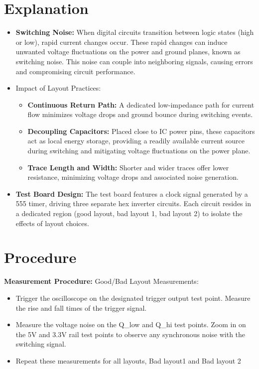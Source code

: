 \documentclass[a4paper,11pt]{article}%
\begin{document}
\section{Explanation}

\begin{itemize}
	\item \textbf{Switching Noise:} When digital circuits transition between logic states (high or low), rapid current changes occur. These rapid changes can induce unwanted voltage fluctuations on the power and ground planes, known as switching noise. This noise can couple into neighboring signals, causing errors and compromising circuit performance.
	\item Impact of Layout Practices:

	      \begin{itemize}
		      \item \textbf{Continuous Return Path:} A dedicated low-impedance path for current flow minimizes voltage drops and ground bounce during switching events.
		      \item \textbf{Decoupling Capacitors:} Placed close to IC power pins, these capacitors act as local energy storage, providing a readily available current source during switching and mitigating voltage fluctuations on the power plane.
		      \item \textbf{Trace Length and Width:} Shorter and wider traces offer lower resistance, minimizing voltage drops and associated noise generation.
	      \end{itemize}
	\item \textbf{Test Board Design:} The test board features a clock signal generated by a 555 timer, driving three separate hex inverter circuits. Each circuit resides in a dedicated region (good layout, bad layout 1, bad layout 2) to isolate the effects of layout choices.
\end{itemize}




\section{Procedure}


\textbf{Measurement Procedure:}
Good/Bad Layout Measurements:
\begin{itemize}
	\item Trigger the oscilloscope on the designated trigger output test point.
	Measure the rise and fall times of the trigger signal.
	\item Measure the voltage noise on the Q\_low and Q\_hi test points.
	Zoom in on the 5V and 3.3V rail test points to observe any synchronous noise with the switching signal.
	\item Repeat these measurements for all layouts, Bad layout1 and Bad layout 2
\end{itemize}
\end{document}

